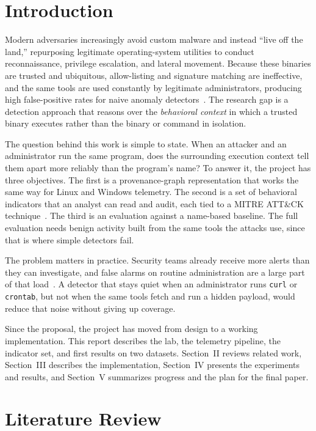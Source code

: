 \documentclass[conference]{IEEEtran}
\begin{document}
\section{Introduction}
Modern adversaries increasingly avoid custom malware and instead ``live off
the land,'' repurposing legitimate operating-system utilities to conduct
reconnaissance, privilege escalation, and lateral movement. Because these
binaries are trusted and ubiquitous, allow-listing and signature matching
are ineffective, and the same tools are used constantly by legitimate
administrators, producing high false-positive rates for naive anomaly
detectors~\cite{barrsmith2021survivalism,ongun2021lotl}. The research gap is
a detection approach that reasons over the \emph{behavioral context} in
which a trusted binary executes rather than the binary or command in
isolation.

The question behind this work is simple to state. When an attacker and an
administrator run the same program, does the surrounding execution context
tell them apart more reliably than the program's name? To answer it, the
project has three objectives. The first is a provenance-graph representation
that works the same way for Linux and Windows telemetry. The second is a set
of behavioral indicators that an analyst can read and audit, each tied to a
MITRE ATT\&CK technique~\cite{strom2018attack}. The third is an evaluation
against a name-based baseline. The full evaluation needs benign activity
built from the same tools the attacks use, since that is where simple
detectors fail.

The problem matters in practice. Security teams already receive more alerts
than they can investigate, and false alarms on routine administration are a
large part of that load~\cite{hassan2019nodoze}. A detector that stays quiet
when an administrator runs \texttt{curl} or \texttt{crontab}, but not when
the same tools fetch and run a hidden payload, would reduce that noise
without giving up coverage.

Since the proposal, the project has moved from design to a working
implementation. This report describes the lab, the telemetry pipeline, the
indicator set, and first results on two datasets. Section~II reviews related
work, Section~III describes the implementation, Section~IV presents the
experiments and results, and Section~V summarizes progress and the plan for
the final paper.

\section{Literature Review}
\end{document}
